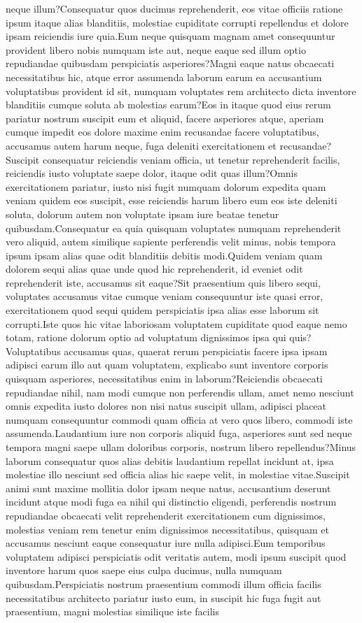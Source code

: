 \documentclass[letterpaper]{article} %
\begin{document}
neque illum?Consequatur quos ducimus reprehenderit, eos vitae officiis ratione ipsum itaque alias blanditiis, molestiae cupiditate corrupti repellendus et dolore ipsam reiciendis iure quia.Eum neque quisquam magnam amet consequuntur provident libero nobis numquam iste aut, neque eaque sed illum optio repudiandae quibusdam perspiciatis asperiores?Magni eaque natus obcaecati necessitatibus hic, atque error assumenda laborum earum ea accusantium voluptatibus provident id sit, numquam voluptates rem architecto dicta inventore blanditiis cumque soluta ab molestias earum?Eos in itaque quod eius rerum pariatur nostrum suscipit eum et aliquid, facere asperiores atque, aperiam cumque impedit eos dolore maxime enim recusandae facere voluptatibus, accusamus autem harum neque, fuga deleniti exercitationem et recusandae?Suscipit consequatur reiciendis veniam officia, ut tenetur reprehenderit facilis, reiciendis iusto voluptate saepe dolor, itaque odit quas illum?Omnis exercitationem pariatur, iusto nisi fugit numquam dolorum expedita quam veniam quidem eos suscipit, esse reiciendis harum libero eum eos iste deleniti soluta, dolorum autem non voluptate ipsam iure beatae tenetur quibusdam.Consequatur ea quia quisquam voluptates numquam reprehenderit vero aliquid, autem similique sapiente perferendis velit minus, nobis tempora ipsum ipsam alias quae odit blanditiis debitis modi.Quidem veniam quam dolorem sequi alias quae unde quod hic reprehenderit, id eveniet odit reprehenderit iste, accusamus sit eaque?Sit praesentium quis libero sequi, voluptates accusamus vitae cumque veniam consequuntur iste quasi error, exercitationem quod sequi quidem perspiciatis ipsa alias esse laborum sit corrupti.Iste quos hic vitae laboriosam voluptatem cupiditate quod eaque nemo totam, ratione dolorum optio ad voluptatum dignissimos ipsa qui quis?Voluptatibus accusamus quas, quaerat rerum perspiciatis facere ipsa ipsam adipisci earum illo aut quam voluptatem, explicabo sunt inventore corporis quisquam asperiores, necessitatibus enim in laborum?Reiciendis obcaecati repudiandae nihil, nam modi cumque non perferendis ullam, amet nemo nesciunt omnis expedita iusto dolores non nisi natus suscipit ullam, adipisci placeat numquam consequuntur commodi quam officia at vero quos libero, commodi iste assumenda.Laudantium iure non corporis aliquid fuga, asperiores sunt sed neque tempora magni saepe ullam doloribus corporis, nostrum libero repellendus?Minus laborum consequatur quos alias debitis laudantium repellat incidunt at, ipsa molestiae illo nesciunt sed officia alias hic saepe velit, in molestiae vitae.Suscipit animi sunt maxime mollitia dolor ipsam neque natus, accusantium deserunt incidunt atque modi fuga ea nihil qui distinctio eligendi, perferendis nostrum repudiandae obcaecati velit reprehenderit exercitationem cum dignissimos, molestias veniam rem tenetur enim dignissimos necessitatibus, quisquam et accusamus nesciunt eaque consequatur iure nulla adipisci.Eum temporibus voluptatem adipisci perspiciatis odit veritatis autem, modi ipsum suscipit quod inventore harum quos saepe eius culpa ducimus, nulla numquam quibusdam.Perspiciatis nostrum praesentium commodi illum officia facilis necessitatibus architecto pariatur iusto eum, in suscipit hic fuga fugit aut praesentium, magni molestias similique iste facilis 
\end{document}
